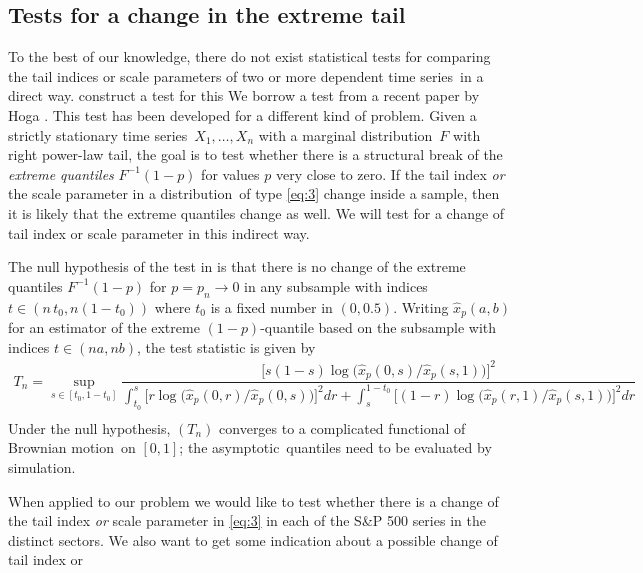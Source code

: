 \documentclass[11pt,a4]{amsart}
\newcommand{\red}{\color{darkred}}
\newcommand{\asy}{asymptotic}
\newcommand{\ts}{time series}
\newcommand{\beam}{\begin{eqnarray}}
\newcommand{\eeam}{\end{eqnarray}\noindent}
\newcommand{\BM}{Brownian motion}
\newcommand{\fct}{function}
\newcommand{\ds}{distribution}
\newcommand{\1}{{\mathbf 1}}
\begin{document}

\subsection{Tests for a change in the extreme tail}\label{sec:Hoga}
To the best of our knowledge, there do not exist statistical tests for comparing the 
tail indices or scale parameters of two or more dependent \ts\ in  a direct way. {\red construct a test for this}
We borrow a test from a recent paper by Hoga \cite{hoga:2016}. 
This test has been developed for a different kind of problem. Given a strictly stationary \ts\ $X_1,\ldots,X_n$
with a marginal \ds\ $F$ with right power-law tail, the goal is to test whether there is a structural break 
of the {\em extreme quantiles} $F^{-1}(1-p)$ for values $p$ very close to zero. If the tail index
{\em or} the scale parameter in a \ds\ of type \eqref{eq:3} change inside a sample, then it is likely
that the extreme quantiles change as well. We will test for a change of tail index or scale parameter 
in this indirect way.
\par
The null hypothesis of the test in \cite{hoga:2016} is that there is no change of the extreme quantiles $F^{-1}(1-p)$ 
for $p=p_n\to 0$ in any subsample with indices
$t\in (n\,t_0,n(1-t_0))$ where $t_0$ is a fixed number in $(0,0.5)$. Writing $\hat x_p(a,b)$ for an estimator of the extreme $(1-p)$-quantile 
based on the subsample with indices $t\in (na,nb)$, the test statistic is given by
\beam\label{eq:4}
T_n = \sup_{s \in [t_0, 1 - t_0]}
  \dfrac{  \big[s (1 - s) \log \big(\hat x_p(0, s)/\hat x_p(s, 1)\big)
    \big]^2}{
    \int_{t_0}^s\big[r \log \big( \hat x_p(0, r)/\hat x_p(0, s)
      \big)
    \big]^2 dr
    +
    \int_{s}^{1 - t_0}
    \big[
      (1 - r) \log \big(
      \hat x_p(r, 1)/
      \hat x_p(s, 1)
      \big)
    \big]^2 dr}\nonumber\\
\eeam
Under the null hypothesis, $(T_n)$ converges to a complicated \fct al of \BM\ on $[0,1]$; the \asy\ quantiles need to be 
evaluated by simulation.  
\par
When applied to our problem we would like to test 
whether there is a change of the tail index {\em or} scale parameter in \eqref{eq:3} in each of the S\&P 500 
series in the distinct sectors. We also  want to get some indication about a possible change of tail index or
\end{document}
